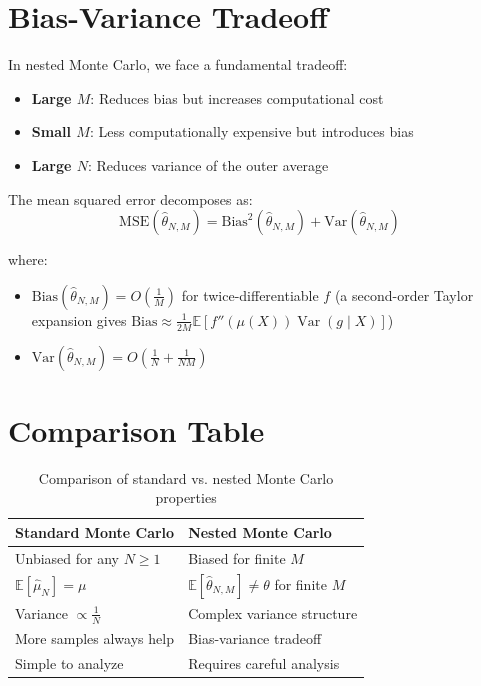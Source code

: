 \begin{notechapter}
\section{Bias-Variance Tradeoff}

In nested Monte Carlo, we face a fundamental tradeoff:

\begin{itemize}
\item \textbf{Large $M$}: Reduces bias but increases computational cost
\item \textbf{Small $M$}: Less computationally expensive but introduces bias
\item \textbf{Large $N$}: Reduces variance of the outer average
\end{itemize}

The mean squared error decomposes as:
\begin{equation}
\text{MSE}(\hat{\theta}_{N,M}) = \text{Bias}^2(\hat{\theta}_{N,M}) + \text{Var}(\hat{\theta}_{N,M})
\end{equation}

where:
\begin{itemize}
\item $\text{Bias}(\hat{\theta}_{N,M}) = O\left(\frac{1}{M}\right)$ for twice-differentiable $f$ (a second-order Taylor expansion gives $\text{Bias} \approx \frac{1}{2M}\mathbb{E}[f''(\mu(X))\operatorname{Var}(g\mid X)]$)
\item $\text{Var}(\hat{\theta}_{N,M}) = O\left(\frac{1}{N} + \frac{1}{NM}\right)$
\end{itemize}

\section{Comparison Table}

\begin{table}[h]
\centering
\begin{tabular}{p{}p{}}
\toprule
\textbf{Standard Monte Carlo} & \textbf{Nested Monte Carlo} \\
\midrule
Unbiased for any $N \geq 1$ & Biased for finite $M$ \\
$\mathbb{E}[\hat{\mu}_N] = \mu$ & $\mathbb{E}[\hat{\theta}_{N,M}] \neq \theta$ for finite $M$ \\
Variance $\propto \frac{1}{N}$ & Complex variance structure \\
More samples always help & Bias-variance tradeoff \\
Simple to analyze & Requires careful analysis \\
\bottomrule
\end{tabular}
\caption{Comparison of standard vs. nested Monte Carlo properties}
\end{table}


\end{notechapter}
